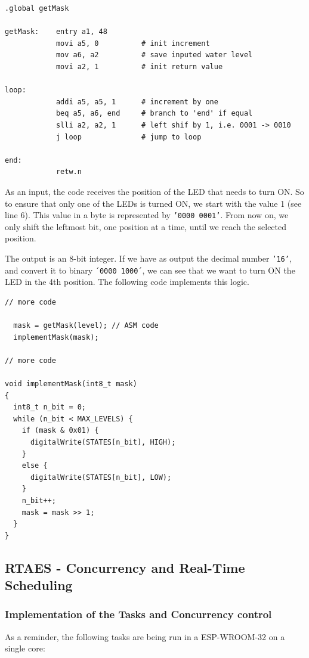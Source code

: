 \documentclass[11pt]{article}
\begin{document}
\begin{verbatim}
.global getMask

getMask:    entry a1, 48
            movi a5, 0          # init increment
            mov a6, a2          # save inputed water level
            movi a2, 1          # init return value

loop: 
            addi a5, a5, 1      # increment by one
            beq a5, a6, end     # branch to 'end' if equal
            slli a2, a2, 1      # left shif by 1, i.e. 0001 -> 0010
            j loop              # jump to loop 

end:
            retw.n
\end{verbatim}

As an input, the code receives the position of the LED that needs to turn ON. So to ensure that only one of the LEDs is turned ON, we start with the value 1 (see line 6). This value in a byte is represented by \texttt{'0000 0001'}. From now on, we only shift the leftmost bit, one position at a time, until we reach the selected position.

The output is an 8-bit integer. If we have as output the decimal number \texttt{'16'}, and convert it to binary \texttt{´0000 1000´}, we can see that we want to turn ON the LED in the 4th position. The following code implements this logic. 

\begin{verbatim}
// more code

  mask = getMask(level); // ASM code
  implementMask(mask);

// more code

void implementMask(int8_t mask)
{
  int8_t n_bit = 0;
  while (n_bit < MAX_LEVELS) {
    if (mask & 0x01) {
      digitalWrite(STATES[n_bit], HIGH);
    }
    else {
      digitalWrite(STATES[n_bit], LOW);
    }
    n_bit++;
    mask = mask >> 1;
  }
}
\end{verbatim}


\subsection{RTAES - Concurrency and Real-Time Scheduling}

\subsubsection{Implementation of the Tasks and Concurrency control}

As a reminder, the following tasks are being run in a ESP-WROOM-32 on a single core:
\end{document}
